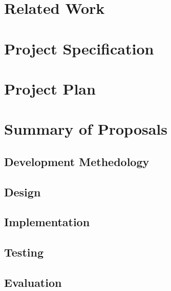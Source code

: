 \documentclass{ProgressReport}[2020/09/15]
\begin{document}
        \chapter{Related Work}
        \chapter{Project Specification}
        \chapter{Project Plan}

        \chapter{Summary of Proposals}
        \section{Development Methedology}
        \section{Design}
        \section{Implementation}
        \section{Testing}
        \section{Evaluation}
	
	
	
	\clearpage
	\printbibliography
	\nocite{*} %
\end{document}
